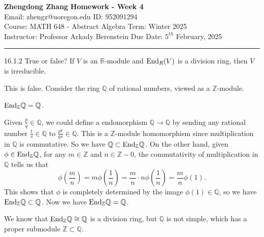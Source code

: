 \documentclass[a4paper, 12pt]{article}
\begin{document}
\noindent
\large\textbf{Zhengdong Zhang} \hfill \textbf{Homework - Week 4}   \\
Email: zhengz@uoregon.edu \hfill ID: 952091294 \\
\normalsize Course: MATH 648 - Abstract Algebra  \hfill Term: Winter 2025\\
Instructor: Professor Arkady Berenstein \hfill Due Date: $5^{th}$ February, 2025 \\
\noindent\rule{7in}{2.8pt}
\begin{problem}{16.1.2}
True or false? If \(V\) is an \(\mathbb{R}\)-module and \(\text{End}_R(V)\) is a division ring, then \(V\) is irreducible.
\end{problem}
\begin{solution}
This is false. Consider the ring \(\mathbb{Q}\) of rational numbers, viewed as a \(\mathbb{Z}\)-module. 
\begin{claim}
\(\text{End}_{\mathbb{Z}}\mathbb{Q}=\mathbb{Q}\).
\end{claim}
\begin{claimproof}
Given \(\frac{p}{q}\in \mathbb{Q}\), we could define a endomorphism \(\mathbb{Q}\rightarrow \mathbb{Q}\) by sending any rational number \(\frac{t}{s}\in \mathbb{Q}\) to 
\(\frac{pt}{qs}\in \mathbb{Q}\). This is a \(\mathbb{Z}\)-module homomorphism since multiplication in \(\mathbb{Q}\) is commutative. So we have \(\mathbb{Q}\subset \text{End}_{\mathbb{Z}}\mathbb{Q}\). 
On the other hand, given \(\phi\in \text{End}_{\mathbb{Z}}\mathbb{Q}\), for any \(m\in \mathbb{Z}\) and \(n\in \mathbb{Z}-0\), the commutativity of multiplication in \(\mathbb{Q}\) tells us that 
\[\phi(\frac{m}{n})=m\phi(\frac{1}{n})=\frac{m}{n}\cdot n\phi(\frac{1}{n})=\frac{m}{n}\phi(1).\]
This shows that \(\phi\) is completely determined by the image \(\phi(1)\in \mathbb{Q}\), so we have \(\text{End}_{\mathbb{Z}}\mathbb{Q}\subset \mathbb{Q}\). Now we have \(\text{End}_{\mathbb{Z}}\mathbb{Q}=\mathbb{Q}\).
\end{claimproof}

We know that \(\text{End}_{\mathbb{Z}}\mathbb{Q}\cong \mathbb{Q}\) is a division ring, but \(\mathbb{Q}\) is not simple, which has a proper submodule \(\mathbb{Z}\subset \mathbb{Q}\).
\end{solution}
\end{document}
